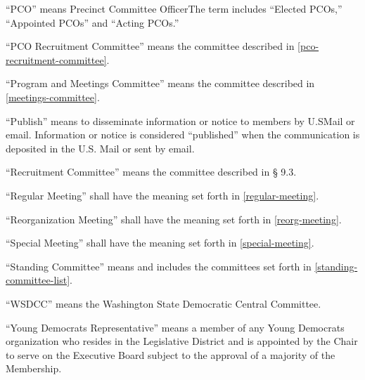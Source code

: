 \begin{alphalist}
    \item “PCO” means Precinct Committee OfficerThe term includes “Elected PCOs,” “Appointed PCOs” and “Acting PCOs.”
    \item “PCO Recruitment Committee” means the committee described in \autoref{pco-recruitment-committee}.
    \item “Program and Meetings Committee” means the committee described in \autoref{meetings-committee}.
    \item “Publish” means to disseminate information or notice to members by U.SMail or email.  Information or notice is considered “published” when the communication is deposited in the U.S. Mail or sent by email.
    \item “Recruitment Committee” means the committee described in § 9.3.
    \item “Regular Meeting” shall have the meaning set forth in \autoref{regular-meeting}.
    \item “Reorganization Meeting” shall have the meaning set forth in \autoref{reorg-meeting}.
    \item “Special Meeting” shall have the meaning set forth in \autoref{special-meeting}.
    \item “Standing Committee” means and includes the committees set forth in \autoref{standing-committee-list}.
    \item “WSDCC” means the Washington State Democratic Central Committee.
    \item “Young Democrats Representative” means a member of any Young Democrats organization who resides in the \fortythird{} Legislative District and is appointed by the Chair to serve on the Executive Board subject to the approval of a majority of the Membership.
\end{alphalist}

